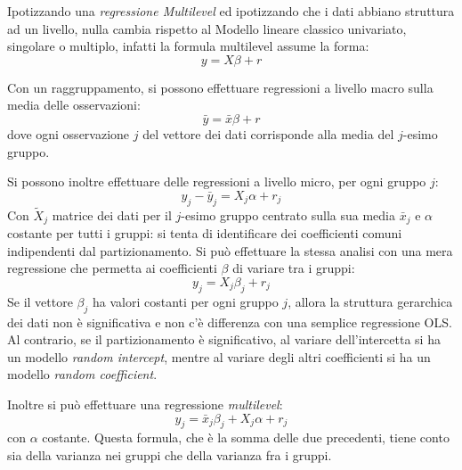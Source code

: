 \documentclass[a4page, 11pt]{article} %
\begin{document}
Ipotizzando una \textit{regressione Multilevel} ed ipotizzando che i dati abbiano struttura ad un livello, nulla cambia rispetto al Modello lineare classico univariato, singolare o multiplo, infatti la formula multilevel assume la forma:
\begin{equation*}
y = X \beta + r
\end{equation*}

Con un raggruppamento, si possono effettuare regressioni a livello macro sulla media delle osservazioni:
\begin{equation*}
  \bar{y} = \bar{x} \beta + r
\end{equation*}
dove ogni osservazione $j$ del vettore dei dati corrisponde alla media del $j$-esimo gruppo.

Si possono inoltre effettuare delle regressioni a livello micro, per ogni gruppo $j$:
\begin{equation*}
  y_j - \bar{y}_j = X_j \alpha + r_j
\end{equation*}
Con $\tilde{X}_j$ matrice dei dati per il $j$-esimo gruppo centrato sulla sua media $\bar{x}_j$ e $\alpha$ costante per tutti i gruppi: si tenta di identificare dei coefficienti comuni indipendenti dal partizionamento.
Si può effettuare la stessa analisi con una mera regressione che permetta ai coefficienti $\beta$ di variare tra i gruppi:
\begin{equation*}
  y_j = X_j \beta_j + r_j
\end{equation*}
Se il vettore $\beta_j$ ha valori costanti per ogni gruppo $j$, allora la struttura gerarchica dei dati non è significativa e non c'è differenza con una semplice regressione OLS.
Al contrario, se il partizionamento è significativo, al variare dell'intercetta si ha un modello \textit{random intercept}, mentre al variare degli altri coefficienti si ha un modello \textit{random coefficient}.

Inoltre si può effettuare una regressione \textit{multilevel}:
\begin{equation*}
  y_j = \bar{x}_j \beta_j + X_j \alpha + r_j
\end{equation*}
con $\alpha$ costante.
Questa formula, che è la somma delle due precedenti, tiene conto sia della varianza nei gruppi che della varianza fra i gruppi.
\end{document}
